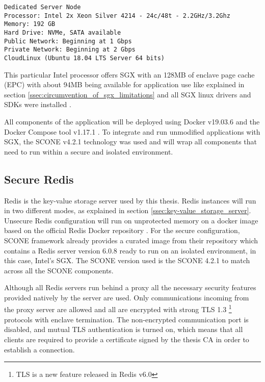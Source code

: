 \lstset{numbers=none, caption=Machine Specifications, label=lst:machine_specs}
\label{lst:ovh_machine_specs}
\begin{lstlisting}
Dedicated Server Node
Processor: Intel 2x Xeon Silver 4214 - 24c/48t - 2.2GHz/3.2Ghz
Memory: 192 GB
Hard Drive: NVMe, SATA available
Public Network: Beginning at 1 Gbps
Private Network: Beginning at 2 Gbps
CloudLinux (Ubuntu 18.04 LTS Server 64 bits)
\end{lstlisting}

This particular Intel processor offers \gls{SGX} with an 128\gls{MB} of enclave page cache (\gls{EPC}) with about 94\gls{MB} being available for application use like explained in section \ref{ssec:circumvention_of_sgx_limitations} and all \gls{SGX} linux drivers and \glspl{SDK} were installed \cite{sgx_drivers:1, sgx_sdk:1}.

All components of the application will be deployed using Docker v19.03.6 \cite{docker:1} and the Docker Compose tool v1.17.1 \cite{docker-compose:1}. To integrate and run unmodified applications with \gls{SGX}, the SCONE v4.2.1 \cite{scone:1} technology was used and will wrap all components that need to run within a secure and isolated environment.

\subsection{Secure Redis}
\label{ssec:secure_redis}

Redis \cite{redis:1} is the key-value storage server used by this thesis. Redis instances will run in two different modes, as explained in section \ref{ssec:key-value_storage_server}. Unsecure Redis configuration will run on unprotected memory on a docker image based on the official Redis Docker repository \cite{redis:6}. For the secure configuration, SCONE framework already provides a curated image from their repository which contains a Redis server version 6.0.8 ready to run on an isolated environment, in this case, Intel's SGX. The SCONE version used is the SCONE 4.2.1 to match across all the SCONE components.

Although all Redis servers run behind a proxy all the necessary security features provided natively by the server are used. Only communications incoming from the proxy server are allowed and all are encrypted with strong \gls{TLS} 1.3 \footnote{TLS is a new feature released in Redis v6.0} protocols with enclave termination. The non-encrypted communication port is disabled, and mutual \gls{TLS} authentication is turned on, which means that all clients are required to provide a certificate signed by the thesis CA in order to establish a connection.

